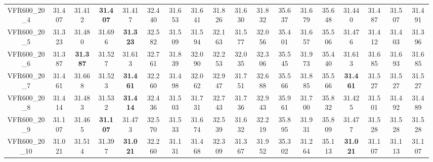 \begin{tabular}{cc|ccc|ccccccccccccc}
VFR600\_20\_4      & 31.407           & 31.412           & {\bf 31.407}     & 31.417           & 32.440           & 31.653           & 31.641           & 31.826           & 31.630           & 31.832           & 35.637           & 31.679           & 35.648           & 31.440           & 31.487           & 31.507           & 31.491          \\ 
VFR600\_20\_5      & 31.323           & 31.480           & 31.696           & {\bf 31.323}     & 32.582           & 31.509           & 31.594           & 32.163           & 31.577           & 32.056           & 35.401           & 31.657           & 35.506           & 31.476           & 31.412           & 31.403           & 31.396          \\ 
VFR600\_20\_6      & 31.387           & {\bf 31.387}     & 31.527           & 31.613           & 32.761           & 31.839           & 32.090           & 32.253           & 32.035           & 32.306           & 35.545           & 31.973           & 35.440           & 31.613           & 31.685           & 31.693           & 31.685          \\ 
VFR600\_20\_7      & 31.461           & 31.668           & 31.523           & {\bf 31.461}     & 32.260           & 31.498           & 32.062           & 32.947           & 31.751           & 32.688           & 35.566           & 31.885           & 35.566           & {\bf 31.461}     & 31.527           & 31.527           & 31.527          \\ 
VFR600\_20\_8      & 31.414           & 31.483           & 31.532           & {\bf 31.414}     & 32.436           & 31.503           & 31.731           & 32.743           & 31.736           & 32.943           & 35.961           & 31.700           & 35.832           & 31.425           & 31.501           & 31.492           & 31.489          \\ 
VFR600\_20\_9      & 31.107           & 31.465           & {\bf 31.107}     & 31.473           & 32.570           & 31.533           & 31.674           & 32.539           & 31.632           & 32.219           & 35.895           & 31.931           & 35.809           & 31.477           & 31.528           & 31.528           & 31.528          \\ 
VFR600\_20\_10     & 31.021           & 31.514           & 31.397           & {\bf 31.021}     & 32.260           & 31.131           & 31.468           & 32.309           & 31.367           & 31.952           & 35.302           & 31.264           & 35.113           & {\bf 31.021}     & 31.107           & 31.113           & 31.107          \\ 

\end{tabular}
